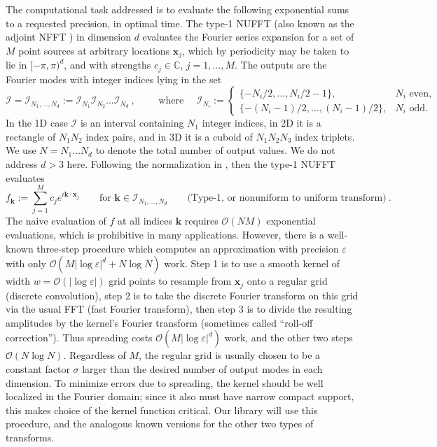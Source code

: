 \documentclass[10pt]{article}
\newcommand{\be}{\begin{equation}}
\newcommand{\ee}{\end{equation}}
\newcommand{\mbf}[1]{{\mathbf #1}}
\newcommand{\eps}{\varepsilon}
\newcommand{\bigO}{{\mathcal O}}
\newcommand{\xx}{\mbf{x}}
\newcommand{\kk}{\mbf{k}}
\newcommand{\KK}{{\mathcal I}}     %
\newcommand{\rat}{\sigma}          %
\newcommand{\NU}{{nonuniform}}       %
\newcommand{\U}{{uniform}}
\begin{document}
The computational task addressed
is to evaluate the following exponential sums to a requested precision,
in optimal time.
The type-1 NUFFT (also known as the adjoint NFFT \cite{nfftchap,usingnfft})
in dimension $d$ %
evaluates the Fourier series expansion for a set of
$M$ point sources at arbitrary locations $\xx_j$, which by periodicity
may be taken to lie in $[-\pi,\pi)^d$, and with
strengths $c_j\in\mathbb{C}$,  $j=1,\dots,M$.
The outputs are the Fourier modes with integer indices lying in
the set
$$
\KK = \KK_{N_1,\dots,N_d} := \KK_{N_1} \KK_{N_2} \dots \KK_{N_d}~,
\qquad\mbox{ where } \quad
\KK_{N_i} := \left\{\begin{array}{ll} \{-N_i/2,\ldots,N_i/2-1\}, & N_i \mbox{ even},\\
\{-(N_i-1)/2,\ldots,(N_i-1)/2\}, & N_i \mbox{ odd}.
\end{array}\right.
$$
In the 1D case $\KK$ is an interval containing $N_1$ integer indices, in 2D it is a rectangle of $N_1N_2$ index pairs, and in 3D it is a cuboid of $N_1N_2N_3$ index triplets.
We use $N=N_1\dots N_d$ to denote the total number of output values.
We do not address $d>3$ here.
Following the normalization in \cite{dutt,nufft}, then the type-1 NUFFT
evaluates
\be
f_\kk := %
\sum_{j=1}^M c_j e^{i \kk\cdot \xx_j}
\qquad \mbox{for } \kk \in \KK_{N_1,\dots,N_d}
\qquad \mbox{(Type-1, or \NU\ to \U\ transform)}
~.
\label{1}
\ee
The naive evaluation of $f$ at all indices $\kk$ requires $\bigO(NM)$
exponential evaluations, which is prohibitive
in many applications.
However, there is a well-known three-step procedure
which computes an approximation with precision $\eps$ with only
$\bigO(M |\log\eps|^d + N \log N)$ work.
Step 1 is to use a smooth kernel of width $w=\bigO(|\log\eps|)$
grid points to resample from $\xx_j$ onto a regular
grid (discrete convolution), step 2 is to
take the discrete Fourier transform on this grid via the usual FFT
(fast Fourier transform), then step 3 is
to divide the resulting amplitudes by the kernel's Fourier transform
(sometimes called ``roll-off correction'').
Thus spreading costs $\bigO(M|\log\eps|^d)$ work, and the other two
steps $\bigO(N \log N)$.
Regardless of $M$, the regular grid is usually chosen to be a constant factor
$\rat$ larger than the desired number of output modes in each dimension.
To minimize errors due to spreading, the kernel should be
well localized in the Fourier domain; since it also must have narrow compact
support, this makes choice of the kernel function critical.
Our library will use this procedure, and the analogous known versions
for the other two types of transforms.
\end{document}
